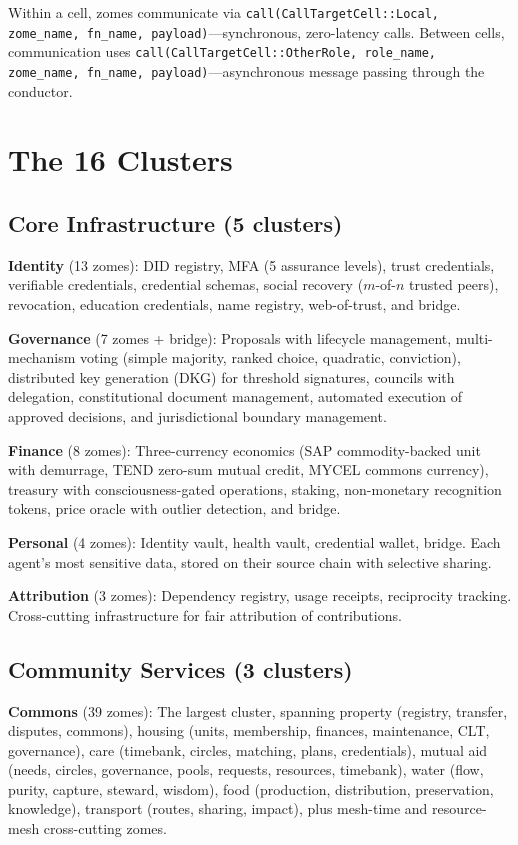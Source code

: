 \documentclass[11pt,twocolumn]{article}
\begin{document}
Within a cell, zomes communicate via \texttt{call(CallTargetCell::Local, zome\_name, fn\_name, payload)}---synchronous, zero-latency calls. Between cells, communication uses
\texttt{call(CallTargetCell::OtherRole, role\_name, zome\_name, fn\_name, payload)}---asynchronous message passing through the conductor.

\section{The 16 Clusters}

\subsection{Core Infrastructure (5 clusters)}

\textbf{Identity} (13 zomes): DID registry, MFA (5 assurance levels),
trust credentials, verifiable credentials, credential schemas, social
recovery ($m$-of-$n$ trusted peers), revocation, education credentials,
name registry, web-of-trust, and bridge.

\textbf{Governance} (7 zomes + bridge): Proposals with lifecycle management,
multi-mechanism voting (simple majority, ranked choice, quadratic, conviction),
distributed key generation (DKG) for threshold signatures, councils with
delegation, constitutional document management, automated execution of approved
decisions, and jurisdictional boundary management.

\textbf{Finance} (8 zomes): Three-currency economics (SAP commodity-backed unit
with demurrage, TEND zero-sum mutual credit, MYCEL commons currency), treasury with
consciousness-gated operations, staking, non-monetary recognition tokens,
price oracle with outlier detection, and bridge.

\textbf{Personal} (4 zomes): Identity vault, health vault, credential
wallet, bridge. Each agent's most sensitive data, stored on their source
chain with selective sharing.

\textbf{Attribution} (3 zomes): Dependency registry, usage receipts,
reciprocity tracking. Cross-cutting infrastructure for fair attribution
of contributions.

\subsection{Community Services (3 clusters)}

\textbf{Commons} (39 zomes): The largest cluster, spanning property
(registry, transfer, disputes, commons), housing (units, membership,
finances, maintenance, CLT, governance), care (timebank, circles,
matching, plans, credentials), mutual aid (needs, circles, governance,
pools, requests, resources, timebank), water (flow, purity, capture,
steward, wisdom), food (production, distribution, preservation, knowledge),
transport (routes, sharing, impact), plus mesh-time and resource-mesh
cross-cutting zomes.
\end{document}
